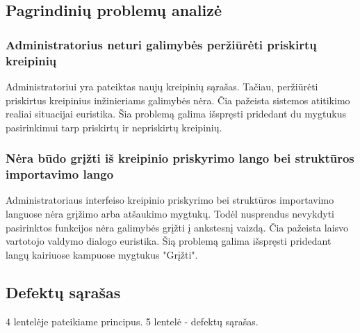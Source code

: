\newpage
	
\subsection{Pagrindinių problemų analizė}
	
	\subsubsection{Administratorius neturi galimybės peržiūrėti priskirtų kreipinių}
		
		Administratoriui yra pateiktas naujų kreipinių sąrašas.
		Tačiau, peržiūrėti priskirtus kreipinius inžinieriams galimybės nėra.
		Čia pažeista sistemos atitikimo realiai situacijai euristika.
		Šia problemą galima išspręsti pridedant du mygtukus pasirinkimui tarp priskirtų ir nepriskirtų kreipinių.
		
	\subsubsection{Nėra būdo grįžti iš kreipinio priskyrimo lango bei struktūros importavimo lango}
	
		Administratoriaus interfeiso kreipinio priskyrimo bei struktūros importavimo languose nėra grįžimo arba atšaukimo mygtukų.
		Todėl nusprendus nevykdyti pasirinktos funkcijos nėra galimybės grįžti į ankstesnį vaizdą.
		Čia pažeista laisvo vartotojo valdymo dialogo euristika.
		Šią problemą galima išspręsti pridedant langų kairiuose kampuose mygtukus "Grįžti".
	
\newpage	
	
\subsection{Defektų sąrašas}

4 lentelėje pateikiame principus. 5 lentelė - defektų sąrašas.

